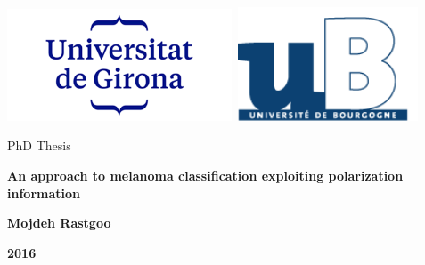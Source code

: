 
\newpage
\thispagestyle{empty}

\vspace{3cm}
\begin{center}
\includegraphics[width=0.5\textwidth]{Figures/logo/udglogo2.png}\
\includegraphics[width= 0.4\textwidth]{Figures/logo/logoub.png}
\end{center}
\vspace{0.5cm}
\begin{center}
PhD Thesis
\end{center}
\vspace{1cm}
\begin{center}
\LARGE{\LARGE{\textbf{An approach to melanoma classification exploiting polarization information
}}}
\end{center}
\vspace{1.5cm}
\begin{center}
{\large{\textbf{Mojdeh Rastgoo}}}
\end{center}
\vspace{1.5cm}
\begin{center}
\textbf{2016}
\end{center}

\cleardoublepage


